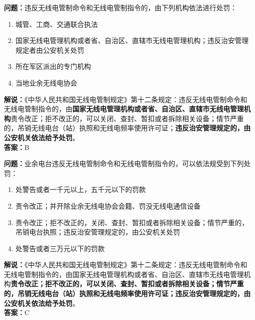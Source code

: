 \documentclass{ctexbook}
\begin{document}
\noindent\textbf{问题：}违反无线电管制命令和无线电管制指令的，由下列机构依法进行处罚：
\begin{enumerate}[label=\Alph*), leftmargin=3em]
	
	\item 城管、工商、交通联合执法
	\item 国家无线电管理机构或者省、自治区、直辖市无线电管理机构；违反治安管理规定者由公安机关处罚
	\item 所在军区派出的专门机构
	\item 当地业余无线电协会
\end{enumerate}
\noindent\textbf{解说：}《中华人民共和国无线电管制规定》第十二条规定：违反无线电管制命令和无线电管制指令的，由\textbf{国家无线电管理机构或者省、自治区、直辖市无线电管理机构}责令改正；拒不改正的，可以关闭、查封、暂扣或者拆除相关设备；情节严重的，吊销无线电台（站）执照和无线电频率使用许可证；\textbf{违反治安管理规定的，由公安机关依法给予处罚}。\\\noindent\textbf{答案：}B


\bigskip


\noindent\textbf{问题：}业余电台违反无线电管制命令和无线电管制指令的，可以依法规受到下列处罚：
\begin{enumerate}[label=\Alph*), leftmargin=3em]
	\item  处警告或者一千元以上，五千元以下的罚款
	\item  责令改正；并开除业余无线电协会会籍、罚没无线电通信设备
	\item  责令改正；拒不改正的，关闭、查封、暂扣或者拆除相关设备；情节严重的，吊销电台执照；违反治安管理规定的，由公安机关处罚
	\item  处警告或者三万元以下的罚款
\end{enumerate}
\noindent\textbf{解说：}《中华人民共和国无线电管制规定》第十二条规定：违反无线电管制命令和无线电管制指令的，由国家无线电管理机构或者省、自治区、直辖市无线电管理机构\textbf{责令改正；拒不改正的，可以关闭、查封、暂扣或者拆除相关设备；情节严重的，吊销无线电台（站）执照和无线电频率使用许可证；违反治安管理规定的，由公安机关依法给予处罚}。\\\noindent\textbf{答案：}C



\end{document}
